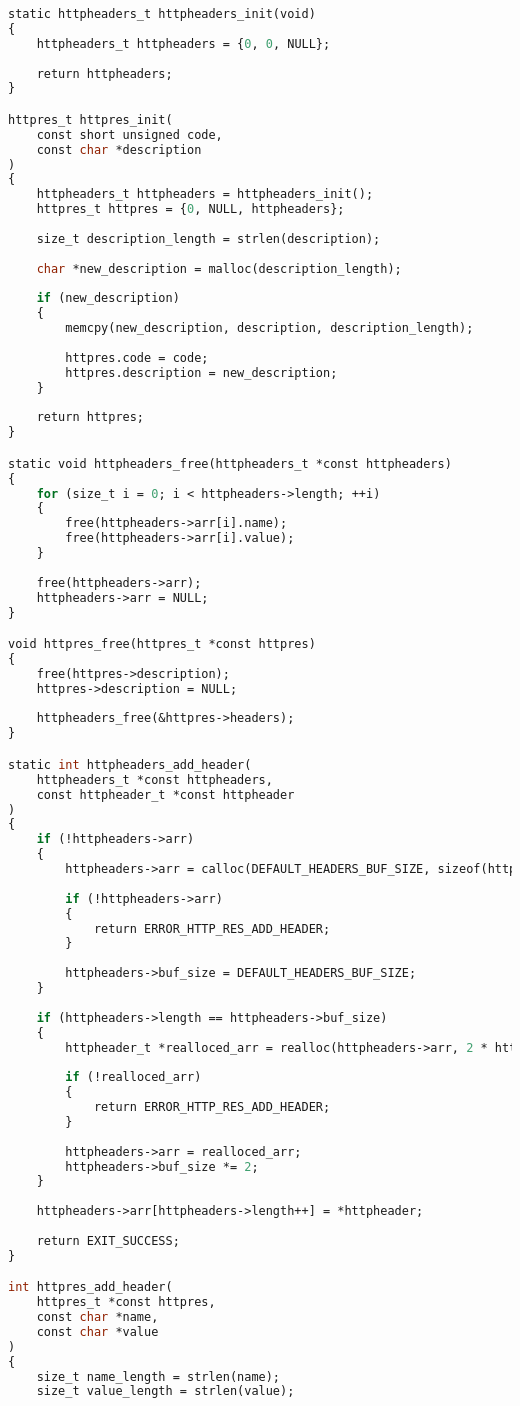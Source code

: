 \begin{lstlisting}[label=httptools_code,caption=Реализация обработчика HTTP-запросов,language=Caml]
static httpheaders_t httpheaders_init(void)
{
	httpheaders_t httpheaders = {0, 0, NULL};
	
	return httpheaders;
}

httpres_t httpres_init(
	const short unsigned code,
	const char *description
)
{
	httpheaders_t httpheaders = httpheaders_init();
	httpres_t httpres = {0, NULL, httpheaders};
	
	size_t description_length = strlen(description);
	
	char *new_description = malloc(description_length);
	
	if (new_description)
	{
		memcpy(new_description, description, description_length);
		
		httpres.code = code;
		httpres.description = new_description;
	}
	
	return httpres;
}

static void httpheaders_free(httpheaders_t *const httpheaders)
{
	for (size_t i = 0; i < httpheaders->length; ++i)
	{
		free(httpheaders->arr[i].name);
		free(httpheaders->arr[i].value);
	}
	
	free(httpheaders->arr);
	httpheaders->arr = NULL;
}

void httpres_free(httpres_t *const httpres)
{
	free(httpres->description);
	httpres->description = NULL;
	
	httpheaders_free(&httpres->headers);
}

static int httpheaders_add_header(
	httpheaders_t *const httpheaders,
	const httpheader_t *const httpheader
)
{
	if (!httpheaders->arr)
	{
		httpheaders->arr = calloc(DEFAULT_HEADERS_BUF_SIZE, sizeof(httpheader_t));
		
		if (!httpheaders->arr)
		{
			return ERROR_HTTP_RES_ADD_HEADER;
		}
		
		httpheaders->buf_size = DEFAULT_HEADERS_BUF_SIZE;
	}
	
	if (httpheaders->length == httpheaders->buf_size)
	{
		httpheader_t *realloced_arr = realloc(httpheaders->arr, 2 * httpheaders->buf_size);
		
		if (!realloced_arr)
		{
			return ERROR_HTTP_RES_ADD_HEADER;
		}
		
		httpheaders->arr = realloced_arr;
		httpheaders->buf_size *= 2;
	}
	
	httpheaders->arr[httpheaders->length++] = *httpheader;
	
	return EXIT_SUCCESS;
}

int httpres_add_header(
	httpres_t *const httpres,
	const char *name,
	const char *value
)
{
	size_t name_length = strlen(name);
	size_t value_length = strlen(value);
	

\end{lstlisting}
